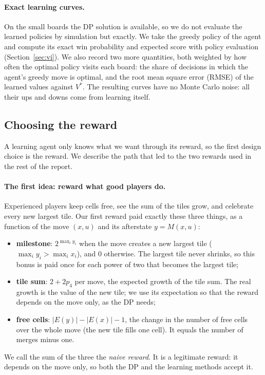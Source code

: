 \documentclass[11pt,a4paper]{article}
\theoremstyle{remark}
\begin{document}
\paragraph{Exact learning curves.} On the small boards the DP solution is available, so we do not evaluate the learned policies by simulation but exactly. We take the greedy policy of the agent and compute its exact win probability and expected score with policy evaluation (Section~\ref{sec:vi}). We also record two more quantities, both weighted by how often the optimal policy visits each board: the share of decisions in which the agent's greedy move is optimal, and the root mean square error (RMSE) of the learned values against $V^*$. The resulting curves have no Monte Carlo noise: all their ups and downs come from learning itself.

\subsection{Choosing the reward}
\label{sec:reward}

A learning agent only knows what we want through its reward, so the first design choice is the reward. We describe the path that led to the two rewards used in the rest of the report.

\paragraph{The first idea: reward what good players do.} Experienced players keep cells free, see the sum of the tiles grow, and celebrate every new largest tile. Our first reward paid exactly these three things, as a function of the move $(x,u)$ and its afterstate $y=M(x,u)$:
\begin{itemize}[leftmargin=*]
\item \textbf{milestone}: $2^{\max_i y_i}$ when the move creates a new largest tile ($\max_i y_i>\max_i x_i$), and 0 otherwise. The largest tile never shrinks, so this bonus is paid once for each power of two that becomes the largest tile;
\item \textbf{tile sum}: $2+2p_4$ per move, the expected growth of the tile sum. The real growth is the value of the new tile; we use its expectation so that the reward depends on the move only, as the DP needs;
\item \textbf{free cells}: $|E(y)|-|E(x)|-1$, the change in the number of free cells over the whole move (the new tile fills one cell). It equals the number of merges minus one.
\end{itemize}
We call the sum of the three the \emph{naive reward}. It is a legitimate reward: it depends on the move only, so both the DP and the learning methods accept it.
\end{document}
